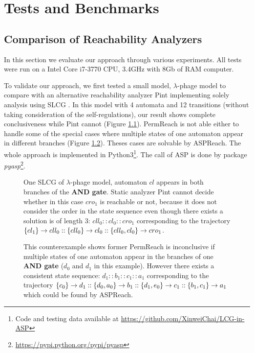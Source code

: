 \chapter{Tests and Benchmarks}\label{chap:test}
\section{Comparison of Reachability Analyzers}
In this section we evaluate our approach through various experiments.
All tests were run on a Intel Core i7-3770 CPU, \@3.4GHz with 8Gb of RAM computer.

To validate our approach, we first tested a small model, $\lambda$-phage model \cite{thieffry1995dynamical} to compare with an alternative reachability analyzer Pint \cite{pauleve2012} implementing solely analysis using SLCG \cite{pauleve2017reduction,folschette2015,pauleve2011}.
In this model with 4 automata and 12 transitions (without taking consideration of the self-regulations),
our result shows complete conclusiveness while Pint cannot (Figure \ref{fig:LCG_lambdaPhage}). %
PermReach \cite{chai2018heuristic} is not able either to handle some of the special cases where multiple states of one automaton appear in different branches (Figure \ref{fig:countexPerm}).
Theses cases are solvable by ASPReach.
The whole approach is implemented in Python3\footnote{Code and testing data available at \url{https://github.com/XinweiChai/LCG-in-ASP}}.
The call of ASP is done by package \textit{pyasp}\footnote{\url{https://pypi.python.org/pypi/pyasp}}. 

\begin{figure}[ht]
\centering
    
    \caption[SLCG of $\lambda$-phage model]{One SLCG of $\lambda$-phage model, automaton $cl$ appears in both branches of the \textbf{AND gate}. Static analyzer Pint cannot decide whether in this case $cro_1$ is reachable or not, because it does not consider the order in the state sequence even though there exists a solution is of length 3: $cll_0::cl_0::cro_1$ corresponding to the trajectory $\acm{cl_1}{cll_1}{cll_0}::\acm{cll_0}{cl_1}{cl_0}::\acm{cll_0,cl_0}{cro_0}{cro_1}$.}
    \label{fig:LCG_lambdaPhage}
\end{figure}
\begin{figure}[ht]
    \centering
    
    \caption[Counterexample of PermReach]{This counterexample shows former PermReach is inconclusive if multiple states of one automaton appear in the branches of one \textbf{AND gate} ($d_0$ and $d_1$ in this example). 
    However there exists a consistent state sequence: $d_1::b_1::c_1::a_1$ corresponding to the trajectory $\acm{c_0}{d_0}{d_1}::\acm{d_0,a_0}{b_0}{b_1}::\acm{d_1,e_0}{c_0}{c_1}::\acm{b_1,c_1}{a_0}{a_1}$ which could be found by ASPReach.}\label{fig:countexPerm}
\end{figure}

